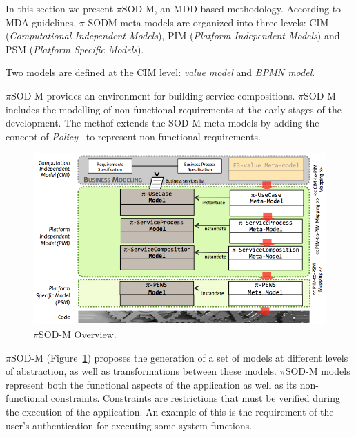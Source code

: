
In this section we present $\pi$SOD-M, an MDD based methodology.
According to MDA guidelines, $\pi$-SODM meta-models are organized into three levels: CIM (\textit{Computational Independent Models}), PIM (\textit{Platform Independent Models}) and PSM (\textit{Platform Specific Models}).

Two models are defined at the CIM level: \textit{value model}
and \textit{BPMN model}.

$\pi$SOD-M provides an environment for building service compositions.
$\pi$SOD-M includes the modelling of non-functional requirements at the early stages of the development.
The methof extends the SOD-M meta-models by adding the concept of \textit{Policy}~\cite{Espinosa-Oviedo2011a} to represent non-functional requirements.

\begin{figure}[h]
\centering
\includegraphics[width=1.0\textwidth]{figs/piSODM}
\caption{$\pi$SOD-M Overview.}
\label{fig:piSOD-M}
\end{figure}

$\pi$SOD-M (Figure~\ref{fig:piSOD-M}) proposes the generation of a set of models at different levels of abstraction, as well as transformations between these models.
$\pi$SOD-M models represent both the functional aspects of the application as well as its non-functional constraints.
Constraints are restrictions that must be verified during the execution of the application.
An example of this is the requirement of the user's authentication for executing some system functions.

